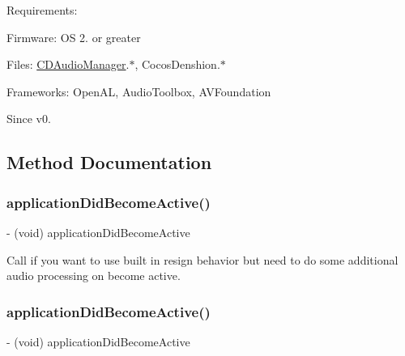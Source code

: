 Requirements\+:
\begin{DoxyItemize}
\item Firmware\+: OS 2. or greater
\item Files\+: \hyperlink{interfaceCDAudioManager}{C\+D\+Audio\+Manager}.$\ast$, Cocos\+Denshion.$\ast$
\item Frameworks\+: Open\+AL, Audio\+Toolbox, A\+V\+Foundation \begin{DoxySince}{Since}
v0. 
\end{DoxySince}

\end{DoxyItemize}

\subsection{Method Documentation}
\mbox{\label{interfaceCDAudioManager_aa572c7a296c0b2de3564f8da368835ef}} 
\subsubsection{\texorpdfstring{application\+Did\+Become\+Active()}{applicationDidBecomeActive()}\hspace{0.1cm}{\footnotesize\ttfamily [1/4]}}
{\footnotesize\ttfamily -\/ (void) application\+Did\+Become\+Active \begin{DoxyParamCaption}{ }\end{DoxyParamCaption}}

Call if you want to use built in resign behavior but need to do some additional audio processing on become active. \mbox{\label{interfaceCDAudioManager_aa572c7a296c0b2de3564f8da368835ef}} 
\subsubsection{\texorpdfstring{application\+Did\+Become\+Active()}{applicationDidBecomeActive()}\hspace{0.1cm}{\footnotesize\ttfamily [2/4]}}
{\footnotesize\ttfamily -\/ (void) application\+Did\+Become\+Active \begin{DoxyParamCaption}{ }\end{DoxyParamCaption}}

